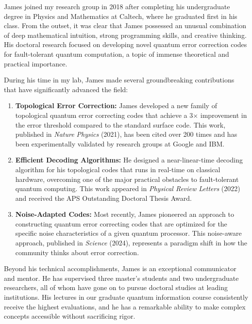 \documentclass[12pt,a4paper]{article}
\begin{document}
James joined my research group in 2018 after completing his undergraduate degree in Physics and Mathematics at Caltech, where he graduated first in his class. From the outset, it was clear that James possessed an unusual combination of deep mathematical intuition, strong programming skills, and creative thinking. His doctoral research focused on developing novel quantum error correction codes for fault-tolerant quantum computation, a topic of immense theoretical and practical importance.

During his time in my lab, James made several groundbreaking contributions that have significantly advanced the field:

\begin{enumerate}[leftmargin=2em, itemsep=4pt]
\item \textbf{Topological Error Correction:} James developed a new family of topological quantum error correcting codes that achieve a 3$\times$ improvement in the error threshold compared to the standard surface code. This work, published in \textit{Nature Physics} (2021), has been cited over 200 times and has been experimentally validated by research groups at Google and IBM.

\item \textbf{Efficient Decoding Algorithms:} He designed a near-linear-time decoding algorithm for his topological codes that runs in real-time on classical hardware, overcoming one of the major practical obstacles to fault-tolerant quantum computing. This work appeared in \textit{Physical Review Letters} (2022) and received the APS Outstanding Doctoral Thesis Award.

\item \textbf{Noise-Adapted Codes:} Most recently, James pioneered an approach to constructing quantum error correcting codes that are optimized for the specific noise characteristics of a given quantum processor. This noise-aware approach, published in \textit{Science} (2024), represents a paradigm shift in how the community thinks about error correction.
\end{enumerate}

Beyond his technical accomplishments, James is an exceptional communicator and mentor. He has supervised three master's students and two undergraduate researchers, all of whom have gone on to pursue doctoral studies at leading institutions. His lectures in our graduate quantum information course consistently receive the highest evaluations, and he has a remarkable ability to make complex concepts accessible without sacrificing rigor.
\end{document}
